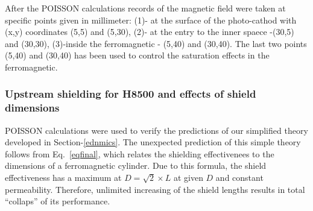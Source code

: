 \documentclass[12pt]{article}
\begin{document}
After  the POISSON calculations  records of the magnetic field were taken 
at specific  points given in millimeter: 
(1)- at the surface of the photo-cathod with (x,y) coordinates  (5,5) and (5,30),
(2)- at the entry to the inner spaece -(30,5) and (30,30), 
(3)-inside the ferromagnetic - (5,40) and (30,40).
The last two points (5,40) and (30,40) has been used 
 to control the saturation effects in the  ferromagnetic.

\subsubsection{Upstream shielding  for H8500 and  effects of  shield dimensions}
\label{emsdimen}
POISSON calculations were used to verify the predictions of our 
simplified theory developed in Section-\ref{ednmics}.
 The  unexpected prediction of
 this  simple theory follows  from  Eq.~\ref{eqfinal}, which  relates the shielding
 effectivenees to the dimensions of a ferromagnetic cylinder. 
Due to this formula, the shield effectiveness has a
 maximum at $D =\sqrt{2}\times L$ at given $D$ and constant permeability. 
Therefore,  unlimited increasing of  the shield  
lengths  results in total ``collaps'' of its performance.
\end{document}
